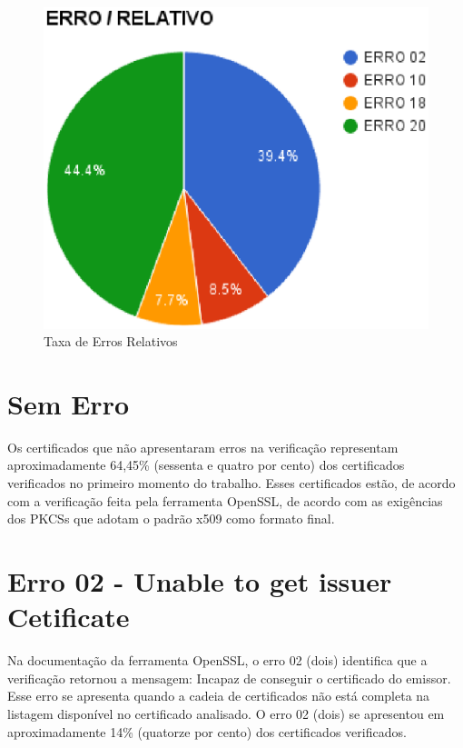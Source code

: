 	\begin{figure}[h]
		\centering
		\includegraphics[keepaspectratio=true,scale=1]{figuras/erRel.eps}
		\caption{Taxa de Erros Relativos}
		\label{fig:graph02}
	\end{figure}

\section[Sem Erro]{Sem Erro}


	Os certificados que não apresentaram erros na verificação representam aproximadamente 64,45\% (sessenta e quatro por cento) dos certificados verificados no primeiro momento do trabalho. Esses certificados estão, de acordo com a verificação feita pela ferramenta OpenSSL, de acordo com as exigências dos PKCSs que adotam o padrão x509 como formato final.

\section[Erro 02 - Unable to get issuer Cetificate]{Erro 02 - Unable to get issuer Cetificate}

	Na documentação da ferramenta OpenSSL, o erro 02 (dois) identifica que a verificação retornou a mensagem: Incapaz de conseguir o certificado do emissor.
	Esse erro se apresenta quando a cadeia de certificados não está completa na listagem disponível no certificado analisado. O erro 02 (dois) se apresentou em aproximadamente 14\% (quatorze por cento) dos certificados verificados.

